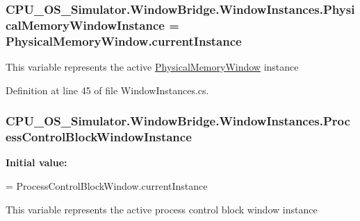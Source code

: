\subsubsection[{Physical\+Memory\+Window\+Instance}]{ C\+P\+U\+\_\+\+O\+S\+\_\+\+Simulator.\+Window\+Bridge.\+Window\+Instances.\+Physical\+Memory\+Window\+Instance = {\bf Physical\+Memory\+Window.\+current\+Instance}\hspace{0.3cm}{\ttfamily [static]}}\label{class_c_p_u___o_s___simulator_1_1_window_bridge_1_1_window_instances_a267a28b98fc5ab6438873d3ba52d686c}


This variable represents the active \hyperlink{class_c_p_u___o_s___simulator_1_1_physical_memory_window}{Physical\+Memory\+Window} instance 



Definition at line 45 of file Window\+Instances.\+cs.

\hypertarget{class_c_p_u___o_s___simulator_1_1_window_bridge_1_1_window_instances_a7c6ba1b614cf567f4a34d455cd98b8e0}{}
\subsubsection[{Process\+Control\+Block\+Window\+Instance}]{ C\+P\+U\+\_\+\+O\+S\+\_\+\+Simulator.\+Window\+Bridge.\+Window\+Instances.\+Process\+Control\+Block\+Window\+Instance\hspace{0.3cm}{\ttfamily [static]}}\label{class_c_p_u___o_s___simulator_1_1_window_bridge_1_1_window_instances_a7c6ba1b614cf567f4a34d455cd98b8e0}
{\bfseries Initial value\+:}
\begin{DoxyCode}
= 
            ProcessControlBlockWindow.currentInstance
\end{DoxyCode}


This variable represents the active process control block window instance 



